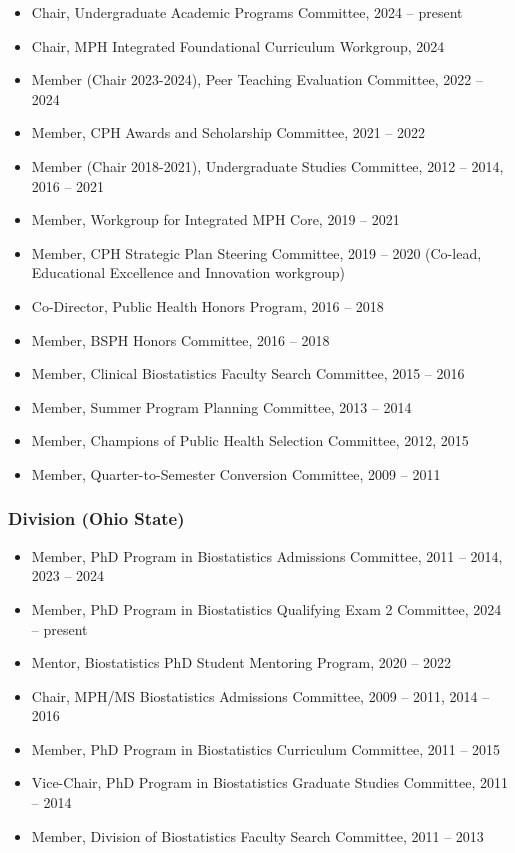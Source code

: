 \documentclass[
  english,
  letterpaper,
  DIV=11,
  numbers=noendperiod]{scrartcl}
\providecommand{\tightlist}{%
  \setlength{\itemsep}{0pt}\setlength{\parskip}{0pt}}
\begin{document}
\begin{itemize}
\tightlist
\item
  Chair, Undergraduate Academic Programs Committee, 2024 -- present
\item
  Chair, MPH Integrated Foundational Curriculum Workgroup, 2024
\item
  Member (Chair 2023-2024), Peer Teaching Evaluation Committee, 2022 --
  2024
\item
  Member, CPH Awards and Scholarship Committee, 2021 -- 2022
\item
  Member (Chair 2018-2021), Undergraduate Studies Committee, 2012 --
  2014, 2016 -- 2021
\item
  Member, Workgroup for Integrated MPH Core, 2019 -- 2021
\item
  Member, CPH Strategic Plan Steering Committee, 2019 -- 2020 (Co-lead,
  Educational Excellence and Innovation workgroup)
\item
  Co-Director, Public Health Honors Program, 2016 -- 2018
\item
  Member, BSPH Honors Committee, 2016 -- 2018
\item
  Member, Clinical Biostatistics Faculty Search Committee, 2015 -- 2016
\item
  Member, Summer Program Planning Committee, 2013 -- 2014
\item
  Member, Champions of Public Health Selection Committee, 2012, 2015
\item
  Member, Quarter-to-Semester Conversion Committee, 2009 -- 2011
\end{itemize}

\subsubsection{Division (Ohio State)}\label{division-ohio-state}

\begin{itemize}
\tightlist
\item
  Member, PhD Program in Biostatistics Admissions Committee, 2011 --
  2014, 2023 -- 2024
\item
  Member, PhD Program in Biostatistics Qualifying Exam 2 Committee, 2024
  -- present
\item
  Mentor, Biostatistics PhD Student Mentoring Program, 2020 -- 2022
\item
  Chair, MPH/MS Biostatistics Admissions Committee, 2009 -- 2011, 2014
  -- 2016
\item
  Member, PhD Program in Biostatistics Curriculum Committee, 2011 --
  2015
\item
  Vice-Chair, PhD Program in Biostatistics Graduate Studies Committee,
  2011 -- 2014
\item
  Member, Division of Biostatistics Faculty Search Committee, 2011 --
  2013
\end{itemize}
\end{document}
